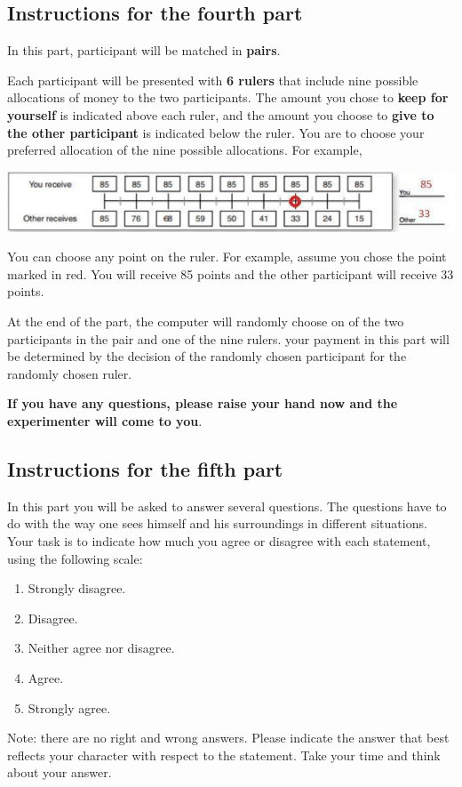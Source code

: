 \subsection*{Instructions for the fourth part}

In this part, participant will be matched in \textbf{pairs}. 

Each participant will be presented with \textbf{6 rulers} that include nine possible allocations of money to the two participants. The amount you chose to \textbf{keep for yourself} is indicated above each ruler, and the amount you choose to \textbf{give to the other participant} is indicated below the ruler. You are to choose your preferred allocation of the nine possible allocations. For example, 
\smallskip

\begin{center}
	\includegraphics[]{svo.png}
\end{center}

You can choose any point on the ruler. For example, assume you chose the point marked in red. You will receive 85 points and the other participant will receive 33 points.

At the end of the part, the computer will randomly choose on of the two participants in the pair and one of the nine rulers. your payment in this part will be determined by the decision of the randomly chosen participant for the randomly chosen ruler.

\textbf{If you have any questions, please raise your hand now and the experimenter will come to you}.

\newpage

\subsection*{Instructions for the fifth part}

In this part you will be asked to answer several questions. The questions have to do with the way one sees himself and his surroundings in different situations. Your task is to indicate how much you agree or disagree with each statement, using the following scale:
\begin{enumerate}
	\item Strongly disagree.
	\item Disagree.
	\item Neither agree nor disagree.
	\item Agree.
	\item Strongly agree.
\end{enumerate}

Note: there are no right and wrong answers. Please indicate the answer that best reflects your character with respect to the statement. Take your time and think about your answer.


% 